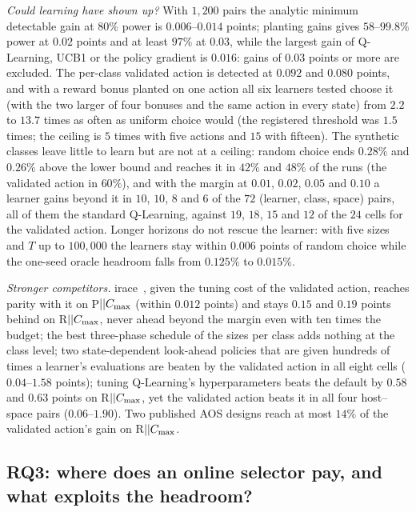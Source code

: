 \emph{Could learning have shown up?} With $1{,}200$ pairs the analytic minimum detectable gain at $80\%$ power is $0.006$--$0.014$ points; planting gains gives $58$--$99.8\%$ power at $0.02$ points and at least $97\%$ at $0.03$, while the largest gain of Q-Learning, UCB1 or the policy gradient is $0.016$: gains of $0.03$ points or more are excluded. The per-class validated action is detected at $0.092$ and $0.080$ points, and with a reward bonus planted on one action all six learners tested choose it (with the two larger of four bonuses and the same action in every state) from $2.2$ to $13.7$ times as often as uniform choice would (the registered threshold was $1.5$ times; the ceiling is $5$ times with five actions and $15$ with fifteen). The synthetic classes leave little to learn but are not at a ceiling: random choice ends $0.28\%$ and $0.26\%$ above the lower bound and reaches it in $42\%$ and $48\%$ of the runs (the validated action in $60\%$), and with the margin at $0.01$, $0.02$, $0.05$ and $0.10$ a learner gains beyond it in $10$, $10$, $8$ and $6$ of the $72$ (learner, class, space) pairs, all of them the standard Q-Learning, against $19$, $18$, $15$ and $12$ of the $24$ cells for the validated action. Longer horizons do not rescue the learner: with five sizes and $T$ up to $100{,}000$ the learners stay within $0.006$ points of random choice while the one-seed oracle headroom falls from $0.125\%$ to $0.015\%$.

\emph{Stronger competitors.} irace~\cite{LopezIbanezEtal2016}, given the tuning cost of the validated action, reaches parity with it on P$||C_{\max}$ (within $0.012$ points) and stays $0.15$ and $0.19$ points behind on R$||C_{\max}$, never ahead beyond the margin even with ten times the budget; the best three-phase schedule of the sizes per class adds nothing at the class level; two state-dependent look-ahead policies that are given hundreds of times a learner's evaluations are beaten by the validated action in all eight cells ($0.04$--$1.58$ points); tuning Q-Learning's hyperparameters beats the default by $0.58$ and $0.63$ points on R$||C_{\max}$, yet the validated action beats it in all four host--space pairs ($0.06$--$1.90$). Two published AOS designs reach at most $14\%$ of the validated action's gain on R$||C_{\max}$.

\subsection{RQ3: where does an online selector pay, and what exploits the headroom?}
\label{sec:rq3}
